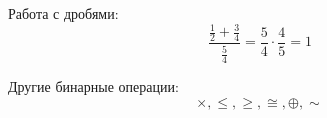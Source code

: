 \documentclass[a4paper, 12pt]{article}
\begin{document}
    Работа с дробями:
    \[\frac{\frac 12 + \frac 34}{\frac 54} = \frac 54 \cdot \frac 45 = 1\]

    Другие бинарные операции:
    \[\times, \le, \ge, \cong, \oplus, \sim\]
\end{document}
